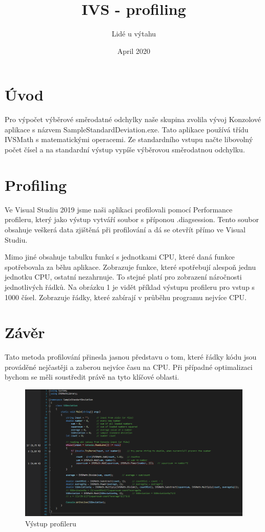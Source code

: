 \documentclass{article}
\title{IVS - profiling}
\author{Lidé u výtahu}
\date{April 2020}
\begin{document}
\maketitle

\tableofcontents

\section{Úvod}
Pro výpočet výběrové směrodatné odchylky naše skupina zvolila vývoj Konzolové aplikace s názvem SampleStandardDeviation.exe. Tato aplikace používá třídu IVSMath s matematickými operacemi. Ze standardního vstupu načte libovolný počet čísel a na standardní výstup vypíše výběrovou směrodatnou odchylku.

\section{Profiling}
Ve Visual Studiu 2019 jsme naši aplikaci profilovali pomocí Performance profileru, který jako výstup vytváří soubor s příponou .diagsession. Tento soubor obsahuje veškerá data zjištěná při profilování a dá se otevřít přímo ve Visual Studiu. 

Mimo jiné obsahuje tabulku funkcí s jednotkami CPU, které daná funkce spotřebovala za běhu aplikace. Zobrazuje funkce, které spotřebují alespoň jednu jednotku CPU, ostatní nezahrnuje. To stejné platí pro zobrazení náročnosti jednotlivých řádků. Na obrázku 1 je vidět příklad výstupu profileru pro vstup s 1000 čísel. Zobrazuje řádky, které zabírají v průběhu programu nejvíce CPU.

\section{Závěr}
Tato metoda profilování přinesla jasnou představu o tom, které řádky kódu jsou prováděné nejčastěji a zaberou nejvíce času na CPU. 
Při případné optimalizaci bychom se měli soustředit právě na tyto klíčové oblasti.

\begin{figure}[h]
\begin{center}
\centering
\includegraphics[scale=0.46,valign=t]{vystup-data1000}
\caption{Výstup profileru}
\label{fig:universe}
\end{center}
\end{figure}
\end{document}
